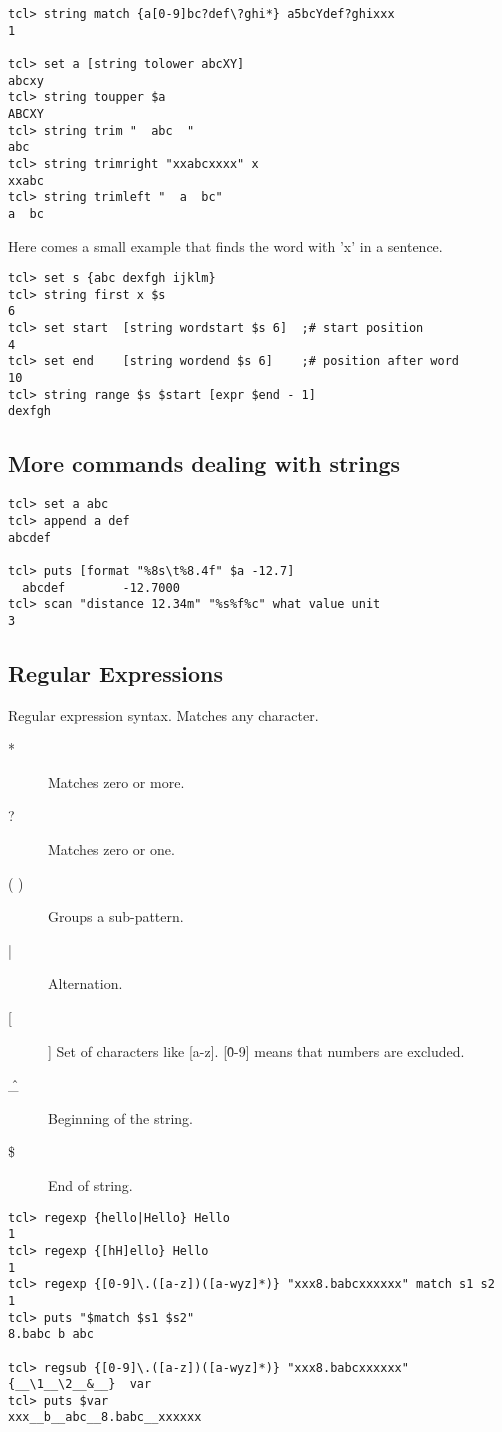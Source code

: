 \begin{verbatim}
tcl> string match {a[0-9]bc?def\?ghi*} a5bcYdef?ghixxx
1

tcl> set a [string tolower abcXY]
abcxy
tcl> string toupper $a
ABCXY
tcl> string trim "  abc  "
abc
tcl> string trimright "xxabcxxxx" x
xxabc
tcl> string trimleft "  a  bc" 
a  bc
\end{verbatim}

Here comes a small example that finds the word with 'x' in a sentence.

\begin{verbatim}
tcl> set s {abc dexfgh ijklm}
tcl> string first x $s
6
tcl> set start  [string wordstart $s 6]  ;# start position
4 
tcl> set end    [string wordend $s 6]    ;# position after word
10 
tcl> string range $s $start [expr $end - 1]
dexfgh
\end{verbatim}

\subsection*{More commands dealing with strings}

\begin{verbatim}
tcl> set a abc
tcl> append a def
abcdef

tcl> puts [format "%8s\t%8.4f" $a -12.7]
  abcdef        -12.7000
tcl> scan "distance 12.34m" "%s%f%c" what value unit
3 
\end{verbatim}

\subsection*{Regular Expressions}

Regular expression syntax. Matches any character.

\begin{description}
\item[*] Matches zero or more.
\item[?] Matches zero or one.
\item[( )] Groups a sub-pattern.
\item[|] Alternation.
\item[[ ]] Set of characters like [a-z]. [\^0-9] means that numbers are excluded.
\item[\^\_] Beginning of the string.
\item[\$] End of string.
\end{description}

\begin{verbatim}
tcl> regexp {hello|Hello} Hello
1
tcl> regexp {[hH]ello} Hello
1
tcl> regexp {[0-9]\.([a-z])([a-wyz]*)} "xxx8.babcxxxxxx" match s1 s2
1
tcl> puts "$match $s1 $s2"
8.babc b abc

tcl> regsub {[0-9]\.([a-z])([a-wyz]*)} "xxx8.babcxxxxxx" {__\1__\2__&__}  var
tcl> puts $var
xxx__b__abc__8.babc__xxxxxx
\end{verbatim}

